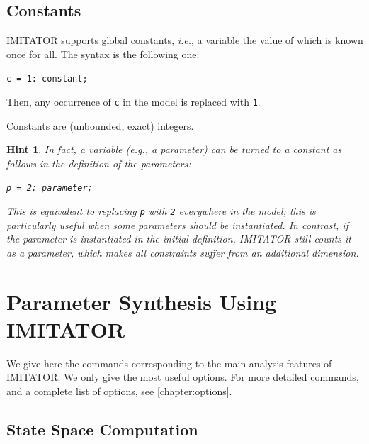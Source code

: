 \documentclass[a4paper,11pt]{report}
\newcommand{\imitator}{\textsf{IMITATOR}}
\newtheorem{hint}{Hint}
\newcommand{\styleIMI}[1]{\textcolor{imicolor}{\texttt{#1}}}
\newcommand{\eg}{\textcolor{colorok}{\textit{e.g.}, }}
\newcommand{\ie}{\textcolor{colorok}{\textit{i.e.}, }}
\begin{document}
\section{Constants}

\imitator{} supports global constants, \ie{} a variable the value of which is known once for all.
The syntax is the following one:
	\begin{center}
		\styleIMI{c = 1: constant;}
	\end{center}
Then, any occurrence of \styleIMI{c} in the model is replaced with \styleIMI{1}.

Constants are (unbounded, exact) integers.


\begin{hint}
	In fact, a variable (\eg{} a parameter) can be turned to a constant as follows in the definition of the parameters:
	\begin{center}
		\styleIMI{p = 2: parameter;}
	\end{center}
	This is equivalent to replacing \styleIMI{p} with \styleIMI{2} everywhere in the model; this is particularly useful when some parameters should be instantiated.
	In contrast, if the parameter is instantiated in the initial definition, \imitator{} still counts it as a parameter, which makes all constraints suffer from an additional dimension.
\end{hint}





\chapter{Parameter Synthesis Using IMITATOR}


We give here the commands corresponding to the main analysis features of \imitator{}.
We only give the most useful options.
For more detailed commands, and a complete list of options, see \cref{chapter:options}.


\section{State Space Computation}\label{ss:mode:statespace}
\end{document}
